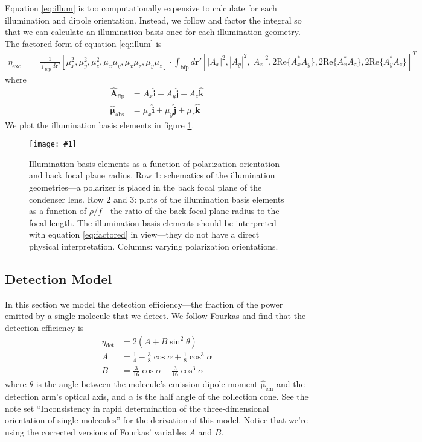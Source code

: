 \documentclass[11pt]{article}
\providecommand{\mb}[1]{\mathbf{#1}}
\providecommand{\mh}[1]{\mathbf{\hat{#1}}}
\providecommand{\bs}[1]{\boldsymbol{#1}}
\providecommand{\fig}[4]{
\begin{figure}[h]
 \captionsetup{width=1.0\linewidth}
 \centering
 \texttt{[image: \#1]}
 \caption{#3}
 \label{fig:#4}
\end{figure}
}
\begin{document}
Equation \ref{eq:illum} is too computationally expensive to calculate for each
illumination and dipole orientation. Instead, we follow \cite{backer} and factor
the integral so that we can calculate an illumination basis once for each
illumination geometry. The factored form of equation \ref{eq:illum} is
\begin{align}
  \eta_{\text{exc}} &= \frac{1}{\int_{\text{bfp}}d\mathbf{r}'}[\mu_x^2, \mu_y^2, \mu_z^2, \mu_x\mu_y, \mu_x\mu_z, \mu_y\mu_z]\cdot\int_{\text{bfp}} d\mathbf{r}'[|A_x|^2, |A_y|^2, |A_z|^2, 2\text{Re}\{A_x^*A_y\}, 2\text{Re}\{A_x^*A_z\}, 2\text{Re}\{A_y^*A_z\}]^T \label{eq:factored}
\end{align}
where
\begin{align}
  \mb{\hat{A}}_{\text{ffp}} &= A_x\mh{i} + A_y\mh{j} + A_z\mh{k}\\
  \hat{\bs{\mu}}_{\text{abs}} &= \mu_x\mh{i} + \mu_y\mh{j} + \mu_z\mh{k}
\end{align}
We plot the illumination basis elements in figure \ref{fig:illum_basis}. 

\fig{../figures/illum_basis.png}{1.0}{Illumination basis elements as a function of
  polarization orientation and back focal plane radius. Row 1: schematics of the
  illumination geometries---a polarizer is placed in the back focal plane of the
  condenser lens. Row 2 and 3: plots of the illumination basis elements as a
  function of $\rho/f$---the ratio of the back focal plane radius to the focal
  length. The illumination basis elements should be interpreted with
  equation \ref{eq:factored} in view---they do not have a direct physical
  interpretation. Columns: varying polarization orientations. }{illum_basis}

\subsection{Detection Model}
In this section we model the detection efficiency---the fraction of the power
emitted by a single molecule that we detect. We follow Fourkas \cite{fourkas} and find that the
detection efficiency is
\begin{align}
  \eta_{\text{det}} &= 2\left(A + B\sin^2\theta\right)\\
  A &= \frac{1}{4} - \frac{3}{8} \cos\alpha + \frac{1}{8} \cos^{3}\alpha\\
  B &= \frac{3}{16} \cos\alpha - \frac{3}{16} \cos^{3}\alpha
\end{align}
where $\theta$ is the angle between the molecule's emission dipole moment
$\hat{\bs{\mu}}_{\text{em}}$ and the detection arm's optical axis, and $\alpha$
is the half angle of the collection cone. See the note set ``Inconsistency in
rapid determination of the three-dimensional orientation of single molecules''
for the derivation of this model. Notice that we're using the corrected versions
of Fourkas' variables $A$ and $B$.
\end{document}
